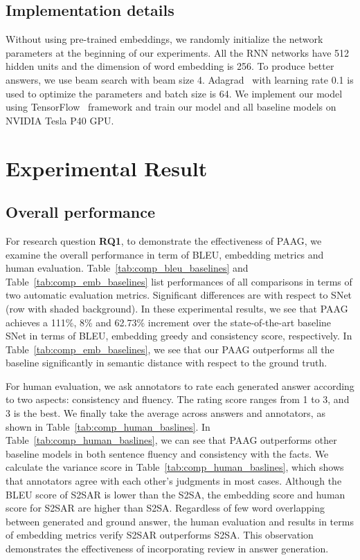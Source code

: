 \subsection{Implementation details}

Without using pre-trained embeddings, we randomly initialize the network parameters at the beginning of our experiments.
All the RNN networks have 512 hidden units and the dimension of word embedding is 256.
To produce better answers, we use beam search with beam size 4.
Adagrad~\cite{Duchi2010AdaptiveSM} with learning rate 0.1 is used to optimize the parameters and batch size is 64.
We implement our model using TensorFlow~\cite{abadi2016tensorflow} framework and train our model and all baseline models on NVIDIA Tesla P40 GPU.

\section{Experimental Result}

\subsection{Overall performance}

For research question \textbf{RQ1}, to demonstrate the effectiveness of PAAG, we examine the overall performance in term of BLEU, embedding metrics and human evaluation. 
Table~\ref{tab:comp_bleu_baselines} and Table~\ref{tab:comp_emb_baselines} list performances of all comparisons in terms of two automatic evaluation metrics.
Significant differences are with respect to SNet (row with shaded background).
In these experimental results, we see that PAAG achieves a 111\%, 8\% and 62.73\% increment over the state-of-the-art baseline SNet in terms of BLEU, embedding greedy and consistency score, respectively.
In Table~\ref{tab:comp_emb_baselines}, we see that our PAAG outperforms all the baseline significantly in semantic distance with respect to the ground truth.

For human evaluation, we ask annotators to rate each generated answer according to two aspects: consistency and fluency.
The rating score ranges from 1 to 3, and 3 is the best.
We finally take the average across answers and annotators, as shown in Table~\ref{tab:comp_human_baslines}.
In Table~\ref{tab:comp_human_baslines}, we can see that PAAG outperforms other baseline models in both sentence fluency and consistency with the facts.
We calculate the variance score in Table~\ref{tab:comp_human_baslines}, which shows that annotators agree with each other's judgments in most cases.
Although the BLEU score of S2SAR is lower than the S2SA, the embedding score and human score for S2SAR are higher than S2SA.
Regardless of few word overlapping between generated and ground answer, the human evaluation and results in terms of embedding metrics verify S2SAR outperforms S2SA.
This observation demonstrates the effectiveness of incorporating review in answer generation.

